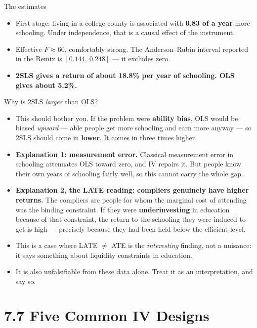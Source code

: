 \documentclass[
  11pt,
  ignorenonframetext,
  aspectratio=169,
]{beamer}
\providecommand{\tightlist}{%
  \setlength{\itemsep}{0pt}\setlength{\parskip}{0pt}}
\begin{document}
\begin{frame}[fragile]{The estimates}
\vspace{-0.2em}
\footnotesize

\begin{itemize}
\tightlist
\item
  First stage: living in a college county is associated with
  \textbf{0.83 of a year} more schooling. Under independence, that is a
  causal effect of the instrument.
\item
  Effective \(F \approx 60\), comfortably strong. The Anderson--Rubin
  interval reported in the Remix is \([0.144,\ 0.248]\) --- it excludes
  zero.
\item
  \textbf{2SLS gives a return of about 18.8\% per year of schooling. OLS
  gives about 5.2\%.}
\end{itemize}
\end{frame}

\begin{frame}{Why is 2SLS \emph{larger} than OLS?}
\protect{}\label{why-is-2sls-larger-than-ols}
\begin{itemize}
\tightlist
\item
  This should bother you. If the problem were \textbf{ability bias}, OLS
  would be biased \emph{upward} --- able people get more schooling and
  earn more anyway --- so 2SLS should come in \textbf{lower}. It comes
  in three times higher.
\item
  \textbf{Explanation 1: measurement error.} Classical measurement error
  in schooling attenuates OLS toward zero, and IV repairs it. But people
  know their own years of schooling fairly well, so this cannot carry
  the whole gap.
\item
  \textbf{Explanation 2, the LATE reading: compliers genuinely have
  higher returns.} The compliers are people for whom the marginal cost
  of attending was the binding constraint. If they were
  \textbf{underinvesting} in education because of that constraint, the
  return to the schooling they were induced to get is high --- precisely
  because they had been held below the efficient level.
\item
  This is a case where LATE \(\neq\) ATE is the \emph{interesting}
  finding, not a nuisance: it says something about liquidity constraints
  in education.
\item
  It is also unfalsifiable from these data alone. Treat it as an
  interpretation, and say so.
\end{itemize}
\end{frame}

\section{7.7 Five Common IV Designs}\label{five-common-iv-designs}
\end{document}
